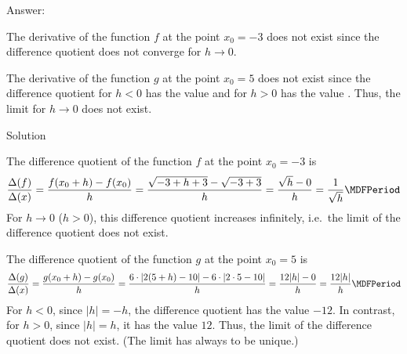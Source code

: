 \begin{MExercises}
\begin{MExercise}
Answer:
\begin{MExerciseItems}
\item The derivative of the function $f$ at the point $x_0 = -3$ does not exist since
the difference quotient
does not converge for $h \rightarrow 0$.
\item The derivative of the function $g$ at the point $x_0 = 5$ does not exist since
the difference quotient for $h < 0$ has the value
 and for $h > 0$ has
the value {}. Thus, the limit for $h \rightarrow 0$
does not exist.
\end{MExerciseItems}
\begin{MHint}{Solution}
 \begin{MExerciseItems}
  \item The difference quotient of the function $f$ at the point $x_0 = - 3$ is
  \[
  \frac{\Delta (f)}{\Delta (x)} = \frac{f(x_0 + h) - f(x_0)}{h} = \frac{\sqrt{-3 + h + 3} - \sqrt{-3 + 3}}{h}
  = \frac{\sqrt{h} - 0}{h} = \frac{1}{\sqrt{h}} \MDFPeriod
  \]
  For $h \rightarrow 0$ ($h > 0$), this difference quotient increases infinitely, i.e.\ the limit 
  of the difference quotient does not exist.
  \item The difference quotient of the function $g$ at the point $x_0 = 5$ is
  \[
  \frac{\Delta (g)}{\Delta (x)} = \frac{g(x_0 + h) - g(x_0)}{h} = \frac{6 \cdot |2 (5+h) - 10| - 6 \cdot |2 \cdot 5 - 10|}{h}
  = \frac{12 |h| - 0}{h} = \frac{12 |h|}{h} \MDFPeriod
  \]
  For $h<0$, since $|h| = -h$, the difference quotient has the value $-12$. In contrast, for 
  $h>0$, since $|h|=h$, it has the value $12$. Thus, the limit of the difference quotient 
  does not exist. (The limit has always to be unique.)
 \end{MExerciseItems}
\end{MHint}
\end{MExercise}


\end{MExercises}



